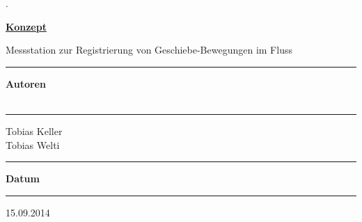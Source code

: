 %
%

\begin{titlepage}


\begin{minipage}[b]{0.117\textwidth}
\hskip 0.05cm
\end{minipage}
\begin{minipage}[b]{0.91\textwidth}
\begin{tiny}.\end{tiny}\vskip 2.8cm
	{\huge
	
	\textbf{\underline{Konzept}}
	
	Messstation zur Registrierung von Geschiebe-Bewegungen im Fluss
	\vskip 0.5cm}
	
	\begin{minipage}[b]{0.27\textwidth}
	\hrule\vskip 0.5cm
		\textbf{Autoren}\\
		\\
	\end{minipage}
	\begin{minipage}[b]{0.03\textwidth}
	\hskip 0.5cm
	\end{minipage}
	\begin{minipage}[b]{0.7\textwidth}
	\hrule\vskip 0.5cm
		Tobias Keller\\
		Tobias Welti\\
	\end{minipage}
	
	\begin{minipage}[b]{0.27\textwidth}
	\hrule\vskip 0.5cm
		\textbf{Datum}
	\end{minipage}
	\begin{minipage}[b]{0.03\textwidth}
	\hskip 0.5cm
	\end{minipage}
	\begin{minipage}[b]{0.7\textwidth}
	\hrule\vskip 0.5cm
		15.09.2014
	\end{minipage}
\end{minipage}
\vskip 0.5cm

\end{titlepage}
